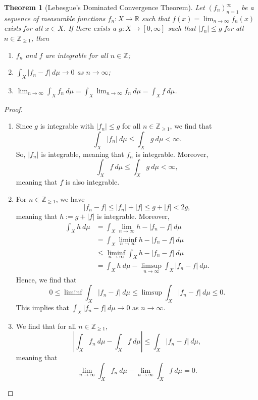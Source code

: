 \documentclass[a4paper, openany]{memoir}
\theoremstyle{definition}
\theoremstyle{plain}
\newtheorem{theorem}[definition]{Theorem}
\begin{document}
    \begin{theorem}[Lebesgue's Dominated Convergence Theorem]
        Let $(f_n)_{n=1}^\infty$ be a sequence of measurable functions $f_n \colon X \to \mathbb{R}$ such that $f(x) = \lim_{n \to \infty} f_n(x)$ exists for all $x \in X$. If there exists a $g \colon X \to [0, \infty]$ such that $|f_n| \leq g$ for all $n \in \mathbb{Z}_{\geq 1}$, then
        \begin{enumerate}
            \item $f_n$ and $f$ are integrable for all $n \in \mathbb{Z}$;
            \item $\int_X |f_n - f| \ d\mu \to 0$ as $n \to \infty$;
            \item $\lim_{n \to \infty} \int_X f_n \ d\mu = \int_X \lim_{n \to \infty} f_n \ d\mu = \int_X f \ d\mu$.
        \end{enumerate}
    \end{theorem}
    \begin{proof}
        \hspace*{0pt}
        \begin{enumerate}
            \item Since $g$ is integrable with $|f_n| \leq g$ for all $n \in \mathbb{Z}_{\geq 1}$, we find that
            \[\int_X |f_n| \ d\mu \leq \int_X g \ d\mu < \infty.\]
            So, $|f_n|$ is integrable, meaning that $f_n$ is integrable. Moreover, 
            \[\int_X f \ d\mu \leq \int_X g \ d\mu < \infty,\]
            meaning that $f$ is also integrable.

            \item For $n \in \mathbb{Z}_{\geq 1}$, we have
            \[|f_n - f| \leq |f_n| + |f| \leq g + |f| < 2g,\]
            meaning that $h := g + |f|$ is integrable. Moreover,
            \begin{align*}
                \int_X h \ d\mu &= \int_X \lim_{n \to \infty} h - |f_n - f| \ d\mu \\
                &= \int_X \liminf_{n \to \infty} h - |f_n - f| \ d\mu \\
                &\leq \liminf_{n \to \infty} \int_X h - |f_n - f| \ d\mu \\
                &= \int_X h \ d\mu - \limsup_{n \to \infty} \int_X |f_n - f| \ d\mu.
            \end{align*}
            Hence, we find that
            \[0 \leq \liminf \int_X |f_n - f| \ d\mu \leq \limsup \int_X |f_n - f| \ d\mu \leq 0.\]
            This implies that $\int_X |f_n - f| \ d\mu \to 0$ as $n \to \infty$.

            \item We find that for all $n \in \mathbb{Z}_{\geq 1}$,
            \[\left|\int_X f_n \ d\mu - \int_X f \ d\mu\right| \leq \int_X |f_n - f| \ d\mu,\]
            meaning that
            \[\lim_{n \to \infty} \int_X f_n \ d\mu - \lim_{n \to \infty} \int_X f \ d\mu = 0.\]
        \end{enumerate}
    \end{proof}
\end{document}
